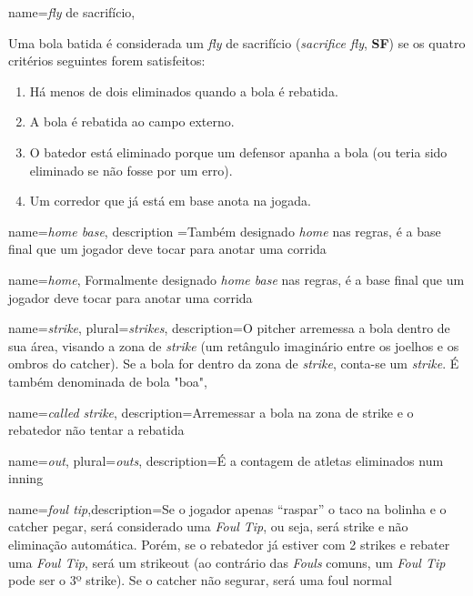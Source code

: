 {
 name={\textit{fly} de sacrif\'icio},
}{ Uma bola batida \'e considerada um \textit{fly} de sacrif\'icio (\textit{sacrifice fly}, \textbf{SF}) se os quatro crit\'erios seguintes forem satisfeitos:
 \begin{enumerate}
 \item H\'a menos de dois eliminados quando a bola \'e rebatida.
 \item A bola \'e rebatida ao campo externo.
 \item O batedor est\'a eliminado porque um defensor apanha a bola (ou teria sido eliminado se n\~ao fosse por um erro).
 \item Um corredor que j\'a est\'a em base anota na jogada.
\end{enumerate}}

{
 name=\textit{home base},
 description ={Tamb\'em designado \textit{home} nas regras, \'e a base final que um jogador deve tocar para anotar uma corrida}
}

{
 name=\textit{home},
}{
 Formalmente designado \textit{home base} nas regras, \'e a base final que um jogador deve tocar para anotar uma corrida}

{
 name=\textit{strike},
 plural=\textit{strikes},
 description={O \gls{pitcher} arremessa a bola dentro de sua \'area, visando a zona de \textit{strike} (um retângulo imaginário entre os joelhos e os ombros do \gls{catcher}). Se a bola for dentro da zona de \textit{strike}, conta-se um \textit{strike}. \'E tamb\'em denominada de bola "boa"},
}


{
 name=\textit{called strike},
 description={Arremessar a bola na zona de strike e o rebatedor n\~ao tentar a rebatida}}

{
 name=\textit{out},
 plural=\textit{outs},
 description={\'E a contagem de atletas eliminados num \gls{inning}}
}



{
 name=\textit{foul tip},description={Se o jogador apenas “raspar” o taco na bolinha e o \gls{catcher} pegar, ser\'a considerado uma \textit{Foul Tip}, ou seja, ser\'a \gls{strike} e n\~ao elimina\c{c}\~ao autom\'atica. Por\'em, se o rebatedor j\'a estiver com 2 \glspl{strike} e rebater uma \textit{Foul Tip}, ser\'a um \gls{strikeout} (ao contrário das \textit{Fouls} comuns, um \textit{Foul Tip} pode ser o 3º \gls{strike}). Se o \gls{catcher} n\~ao segurar, ser\'a uma \gls{foul} normal}
}


